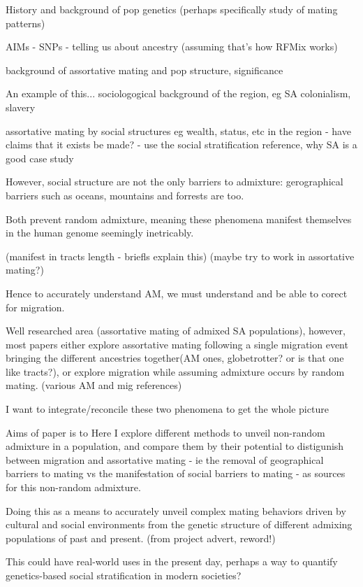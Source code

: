 \documentclass[11pt]{article}
\begin{document}
History and background of pop genetics (perhaps specifically study of mating patterns)

AIMs - SNPs - telling us about ancestry (assuming that's how RFMix works)

background of assortative mating and pop structure, significance

An example of this... sociologogical background of the region, eg SA colonialism, slavery

assortative mating by social structures eg wealth, status, etc in the region - have claims that it exists be made? - use the social stratification reference, why SA is a good case study

However, social structure are not the only barriers to admixture: gerographical barriers such as oceans, mountains and forrests are too.

Both prevent random admixture, meaning these phenomena manifest themselves in the human genome seemingly inetricably.

(manifest in tracts length - briefls explain this)
(maybe try to work in assortative mating?)

Hence to accurately understand AM, we must understand and be able to corect for migration.

Well researched area (assortative mating of admixed SA populations), however, most papers either explore assortative mating following a single migration event bringing the different ancestries together(AM ones, globetrotter? or is that one like tracts?), or explore migration while assuming admixture occurs by random mating. (various AM and mig references)

I want to integrate/reconcile these two phenomena to get the whole picture


Aims of paper is to 
Here I explore different methods to unveil non-random admixture in a population, and compare them by their potential to distigunish between migration and assortative mating - ie the removal of geographical barriers to mating vs the manifestation of social barriers to mating - as sources for this non-random admixture.

Doing this as a means to accurately unveil complex mating behaviors driven by cultural and social environments from the genetic structure of different admixing populations of past and present. (from project advert, reword!)

This could have real-world uses in the present day, perhaps a way to quantify genetics-based social stratification in modern societies?
\end{document}
